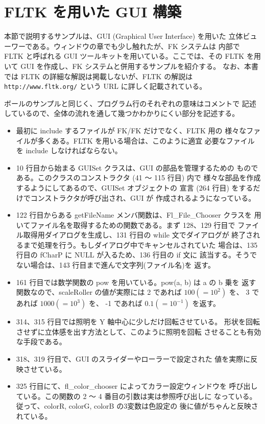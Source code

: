 \section{FLTK を用いた GUI 構築}
本節で説明するサンプルは、GUI (Graphical User Interface) を用いた
立体ビューワーである。ウィンドウの章でも少し触れたが、FK システムは
内部で FLTK と呼ばれる GUI ツールキットを用いている。ここでは、その
FLTK を用いて GUI を作成し、FK システムと併用するサンプルを紹介する。
なお、本書では FLTK の詳細な解説は掲載しないが、FLTK の解説は
\verb+http://www.fltk.org/+ という URL に詳しく記載されている。

ボールのサンプルと同じく、プログラム行のそれぞれの意味はコメントで
記述しているので、全体の流れを通して幾つかわかりにくい部分を記述する。
\begin{itemize}

 \item 最初に include するファイルが FK/FK だけでなく、FLTK 用の
	様々なファイルが多くある。FLTK を用いる場合は、このように適宜
	必要なファイルを include しなければならない。

 \item 10 行目から始まる GUISet クラスは、GUI の部品を管理するための
	ものである。このクラスのコンストラクタ (41 〜 115 行目) 内で
	様々な部品を作成するようにしてあるので、GUISet オブジェクトの
	宣言 (264 行目) をするだけでコンストラクタが呼び出され、GUI が
	作成されるようになっている。

 \item 122 行目からある getFileName メンバ関数は、Fl\_File\_Chooser クラスを
	用いてファイル名を取得するための関数である。まず 128、129 行目で
	ファイル取得用ダイアログを生成し、131 行目の while 文でダイアログが
	終了されるまで処理を行う。もしダイアログ中でキャンセルされていた
	場合は、135 行目の fCharP に NULL が入るため、136 行目の if 文に
	該当する。そうでない場合は、143 行目まで進んで文字列(ファイル名)を
	返す。

 \item 161 行目では数学関数の pow を用いている。pow(a, b) は a の b 乗を
	返す関数なので、scaleRoller の値が実際には
	2 であれば \(100 (= 10^2)\) を、
	3 であれば \(1000 (= 10^3)\) を、
	-1 であれば \(0.1 (= 10^{-1})\) を返す。

 \item 314、315 行目では照明を Y 軸中心に少しだけ回転させている。
	形状を回転させずに立体感を出す方法として、このように照明を回転
	させることも有効な手段である。

 \item 318、319 行目で、GUI のスライダーやローラーで設定された
	値を実際に反映させている。

 \item 325 行目にて、fl\_color\_chooser によってカラー設定ウィンドウを
	呼び出している。この関数の 2 〜 4 番目の引数は実は参照呼び出しに
	なっている。従って、colorR, colorG, colorB の3変数は色設定の
	後に値がちゃんと反映されている。

\end{itemize}
